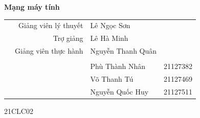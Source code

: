 \documentclass[14pt, a4paper]{extarticle}
\begin{document}
\begin{titlepage}
    \bigskip
    \bigskip

    \centerline{\LARGE{\textbf{Mạng máy tính}}}
    \raggedright
    \bigskip
    \medskip
    \begin{center}

        \begin{table}[h]
            \begin{tabular}{rrlc}
                 & Giảng viên lý thuyết & Lê Ngọc Sơn       &          \\
                 & Trợ giảng            & Lê Hà Minh        &          \\
                 & Giảng viên thực hành & Nguyễn Thanh Quân &          \\
                 &                &                   &          \\
                 &                & Phù Thành Nhân    & 21127382 \\
                 &                & Võ Thanh Tú       & 21127469 \\
                 &                & Nguyễn Quốc Huy   & 21127511
            \end{tabular}
        \end{table}
        \LARGE{21CLC02}
    \end{center}
\end{titlepage}


\pagestyle{fancy}
\fancyhf{}
\addtolength{\topmargin}{-0.70894pt}
\setlength{\headheight}{12.70894pt}

\setlength{\parindent}{0cm}     %
\rfoot{\textbf{\thepage}}

\renewcommand*{\contentsname}{Mục lục}
\renewcommand*{\figurename}{Hình}
\tableofcontents
\newpage
\end{document}

